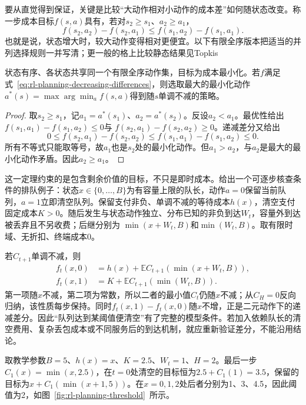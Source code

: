要从直觉得到保证，关键是比较“大动作相对小动作的成本差”如何随状态改变。称一步成本目标$f(s,a)$具有，若对$s_2\geq s_1$、$a_2\geq a_1$，
\begin{equation}
 f(s_2,a_2)-f(s_2,a_1)
 \leq f(s_1,a_2)-f(s_1,a_1).
 \label{eq:rl-planning-decreasing-differences}
\end{equation}
也就是说，状态增大时，较大动作变得相对更便宜。以下有限全序版本把适当的并列选择规则一并写清；更一般的格上比较静态结果见Topkis

\begin{theorem}[递减差分给出单调最优动作]
 \label{thm:rl-planning-monotone}
 状态有序、各状态共享同一个有限全序动作集，目标为成本最小化。若$f$满足式~\eqref{eq:rl-planning-decreasing-differences}，则选取最大的最小化动作
 $a^*(s)=\max\arg\min_a f(s,a)$得到随$s$单调不减的策略。
\end{theorem}
\begin{proof}
 取$s_2\geq s_1$，记$a_1=a^*(s_1)$、$a_2=a^*(s_2)$。反设$a_2<a_1$。最优性给出
 $f(s_1,a_1)-f(s_1,a_2)\leq0$与
 $f(s_2,a_1)-f(s_2,a_2)\geq0$。递减差分又给出
 \[
 0\leq f(s_2,a_1)-f(s_2,a_2)
 \leq f(s_1,a_1)-f(s_1,a_2)\leq0.
 \]
 所有不等式只能取等号，故$a_1$也是$s_2$处的最小化动作。但$a_1>a_2$，与$a_2$是最大的最小化动作矛盾。因此$a_2\geq a_1$。
\end{proof}

这一定理约束的是包含剩余价值的目标，不只是即时成本。给出一个可逐步核查条件的排队例子：状态$x\in\{0,\ldots,B\}$为有容量上限的队长，动作$a=0$保留当前队列，$a=1$立即清空队列。保留支付非负、单调不减的等待成本$h(x)$，清空支付固定成本$K>0$。随后发生与状态动作独立、分布已知的非负到达$W_t$，容量外到达被丢弃且不另收费；后继分别为
$\min(x+W_t,B)$和$\min(W_t,B)$。取有限时域、无折扣、终端成本0。

若$C_{t+1}$单调不减，则
\[
 \begin{aligned}
 f_t(x,0)&=h(x)+\mathbb E C_{t+1}(\min(x+W_t,B)),\\
 f_t(x,1)&=K+\mathbb E C_{t+1}(\min(W_t,B)).
 \end{aligned}
 \]
第一项随$x$不减，第二项为常数，所以二者的最小值$C_t$仍随$x$不减；从$C_H=0$反向归纳，该性质每步保持。同时$f_t(x,1)-f_t(x,0)$随$x$不增，正是二元动作下的递减差分。因此“队列达到某阈值便清空”有了完整的模型条件。若加入依赖队长的清空费用、复杂丢包成本或不同服务后的到达机制，就应重新验证差分，不能沿用结论。

取教学参数$B=5$、$h(x)=x$、$K=2.5$、$W_t=1$、$H=2$。最后一步$C_1(x)=\min(x,2.5)$，在$t=0$处清空的目标恒为$2.5+C_1(1)=3.5$，保留的目标为$x+C_1(\min(x+1,5))$。在$x=0,1,2$处后者分别为1、3、4.5，因此阈值为2，如图~\ref{fig:rl-planning-threshold}~所示。

